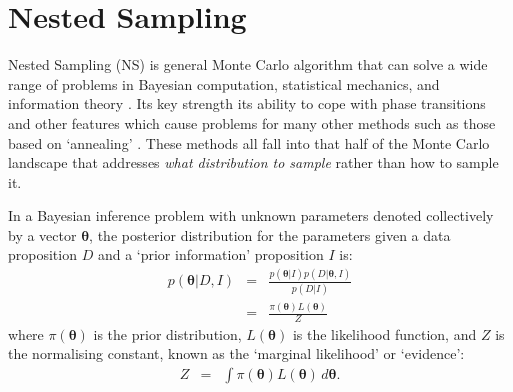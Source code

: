 \documentclass[entropy,article,submit,moreauthors,pdftex,10pt,a4paper]{Definitions/mdpi}
\newcommand{\xx}{\boldsymbol{\theta}}
\newcommand{\dx}{d\boldsymbol{\theta}}
\newcommand{\data}{D}
\newcommand{\II}{I}
\begin{document}


\setlength{\parskip}{0.6em}

\section{Nested Sampling}

Nested Sampling (NS) \citep{skilling2006nested} is general
Monte Carlo algorithm that can solve a wide range of problems in Bayesian
computation, statistical mechanics, and information theory
\citep[e.g.][]{partay2010efficient, exoplanet, baldock2016determining,
brewer2017computing}.
Its key strength its ability to cope with phase transitions and other
features which cause problems for many other methods such as those based
on `annealing' \citep{neal2001annealed}. These methods all fall into that half
of the Monte Carlo landscape that addresses {\em what distribution to sample}
rather than how to sample it.

In a Bayesian inference problem with unknown parameters denoted collectively
by a vector $\xx$, the
posterior distribution for the parameters given a data proposition $\data$ and
a `prior information' proposition $\II$ is:
\begin{eqnarray}
p(\xx | \data, \II) &=&
\frac{p(\xx | \II)p(\data | \xx, \II)}{p(\data | \II)}\\
&=& \frac{\pi(\xx)L(\xx)}{Z}
\end{eqnarray}
where $\pi(\xx)$ is the prior distribution, $L(\xx)$ is the likelihood
function, and $Z$ is the normalising constant, known as the
`marginal likelihood' or `evidence':
\begin{eqnarray}
Z &=& \int \pi(\xx) L(\xx) \, \dx.\label{eqn:evidence}
\end{eqnarray}
\end{document}
